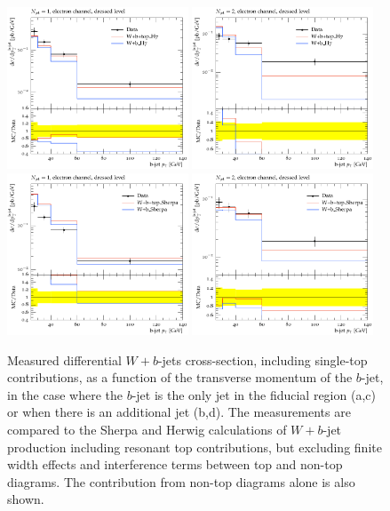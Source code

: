 \documentclass[11pt]{cernrep}
\begin{document}
\begin{figure}
\centering
	\includegraphics[width=0.48\textwidth]{unsubtracted-h7-1jet.pdf}
	\includegraphics[width=0.48\textwidth]{unsubtracted-h7-2jet.pdf}
	\includegraphics[width=0.48\textwidth]{unsubtracted-s22-1jet.pdf}
	\includegraphics[width=0.48\textwidth]{unsubtracted-s22-2jet.pdf}
\caption{\label{fig:unsubtracted}
  Measured differential $W+b$-jets cross-section, including single-top contributions, as a function of the
  transverse momentum of the $b$-jet, in the case where the $b$-jet is the only jet in the fiducial region
  (a,c) or when there is an additional jet (b,d).  The measurements are compared to the Sherpa and Herwig
  calculations of $W+b$-jet production including resonant top contributions, but excluding finite width effects
  and interference terms between top and non-top diagrams. The contribution from non-top diagrams alone is
  also shown.}
\end{figure}
\end{document}
